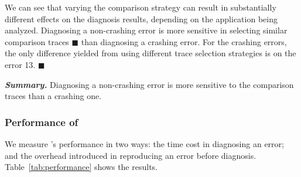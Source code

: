 We can see that varying the comparison strategy can result in
substantially different effects on the diagnosis results,
depending on the application being analyzed. Diagnosing
a non-crashing error is more sensitive in selecting similar
comparison traces $\blacksquare$ than diagnosing
a crashing error.
For the \crash crashing errors, the only difference yielded
from using different trace selection strategies is on
the error 13. $\blacksquare$


\vspace{1mm}
\noindent \textbf{\textit{Summary.}} Diagnosing a non-crashing
error is more sensitive to the comparison traces than a crashing one.

\subsubsection{Performance of \ourtool}

We measure \ourtool's performance in two ways: the time cost
in diagnosing an error; and the overhead introduced
in reproducing an error before diagnosis.  Table~\ref{tab:performance}
shows the results.

